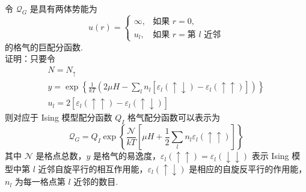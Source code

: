 \documentclass{assignment}
\begin{document}
\begin{prob}
    令 $\mathcal{Q}_G$ 是具有两体势能为
    \[
        u(r)=\left\{\begin{array}{ll}
            \infty,&\text{如果 }r=0,\\
            u_l,&\text{如果 }r=\text{第 }l\text{ 近邻}
        \end{array}\right.
    \]
    的格气的巨配分函数.\\
    证明：只要令
    \begin{gather*}
        N=N_{\uparrow}\\
        y=\exp\left\{\frac{1}{kT}\left(2\mu H-\sum_ln_l[\varepsilon_l(\uparrow\downarrow)-\varepsilon_l(\uparrow\uparrow)]\right)\right\}\\
        u_l=2[\varepsilon_l(\uparrow\uparrow)-\varepsilon_l(\uparrow\downarrow)]
    \end{gather*}
    则对应于 Ising 模型配分函数 $Q_I$ 格气配分函数可以表示为
    \[
        \mathcal{Q}_{G}=Q_I\exp\left\{\frac{\mathcal{N}}{kT}\left[\mu H+\frac{1}{2}\sum_ln_l\varepsilon_l(\uparrow\uparrow)\right]\right\}
    \]
    其中 $\mathcal{N}$ 是格点总数，$y$ 是格气的易逸度，$\varepsilon_l(\uparrow\uparrow)=\varepsilon_l(\downarrow\downarrow)$ 表示 Ising 模型中第 $l$ 近邻自旋平行的相互作用能，$\varepsilon_l(\uparrow\downarrow)$ 是相应的自旋反平行的作用能，$n_l$ 为每一格点第 $l$ 近邻的数目.
\end{prob}
\begin{sol}
    
\end{sol}
\end{document}
